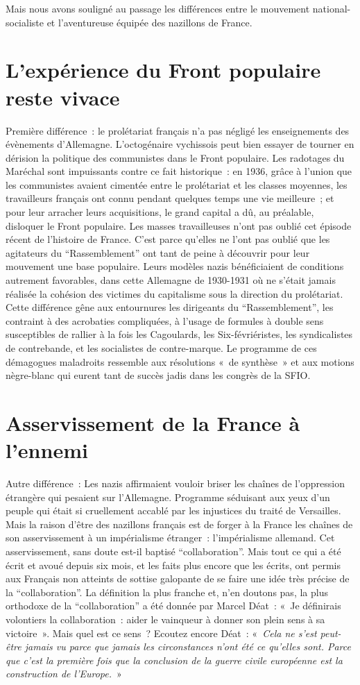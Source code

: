\documentclass[french,twoside]{book} %
\begin{document}
Mais nous avons souligné au passage les différences entre le mouvement national-socialiste et l’aventureuse équipée des nazillons de France.\par
\section[L’expérience du Front populaire reste vivace]{L’expérience du Front populaire reste vivace}
\noindent Première différence : le prolétariat français n’a pas négligé les enseignements des évènements d’Allemagne. L’octogénaire vychissois peut bien essayer de tourner en dérision la politique des communistes dans le Front populaire. Les radotages du Maréchal sont impuissants contre ce fait historique : en 1936, grâce à l’union que les communistes avaient cimentée entre le prolétariat et les classes moyennes, les travailleurs français ont connu pendant quelques temps une vie meilleure ; et pour leur arracher leurs acquisitions, le grand capital a dû, au préalable, disloquer le Front populaire. Les masses travailleuses n’ont pas oublié cet épisode récent de l’histoire de France. C’est parce qu’elles ne l’ont pas oublié que les agitateurs du “Rassemblement” ont tant de peine à découvrir pour leur mouvement une base populaire. Leurs modèles nazis bénéficiaient de conditions autrement favorables, dans cette Allemagne de 1930-1931 où ne s’était jamais réalisée la cohésion des victimes du capitalisme sous la direction du prolétariat. Cette différence gêne aux entournures les dirigeants du “Rassemblement”, les contraint à des acrobaties compliquées, à l’usage de formules à double sens susceptibles de rallier à la fois les Cagoulards, les Six-févriéristes, les syndicalistes de contrebande, et les socialistes de contre-marque. Le programme de ces démagogues maladroits ressemble aux résolutions « de synthèse » et aux motions nègre-blanc qui eurent tant de succès jadis dans les congrès de la SFIO.
\section[Asservissement de la France à l’ennemi]{Asservissement de la France à l’ennemi}
\noindent Autre différence : Les nazis affirmaient vouloir briser les chaînes de l’oppression étrangère qui pesaient sur l’Allemagne. Programme séduisant aux yeux d’un peuple qui était si cruellement accablé par les injustices du traité de Versailles. Mais la raison d’être des nazillons français est de forger à la France les chaînes de son asservissement à un impérialisme étranger : l’impérialisme allemand. Cet asservissement, sans doute est-il baptisé “collaboration”. Mais tout ce qui a été écrit et avoué depuis six mois, et les faits plus encore que les écrits, ont permis aux Français non atteints de sottise galopante de se faire une idée très précise de la “collaboration”. La définition la plus franche et, n’en doutons pas, la plus orthodoxe de la “collaboration” a été donnée par Marcel Déat : « Je définirais volontiers la collaboration : aider le vainqueur à donner son plein sens à sa victoire ». Mais quel est ce sens ? Ecoutez encore Déat : « \emph{Cela ne s’est peut-être jamais vu parce que jamais les circonstances n’ont été ce qu’elles sont. Parce que c’est la première fois que la conclusion de la guerre civile européenne est la construction de l’Europe.} »
\end{document}
